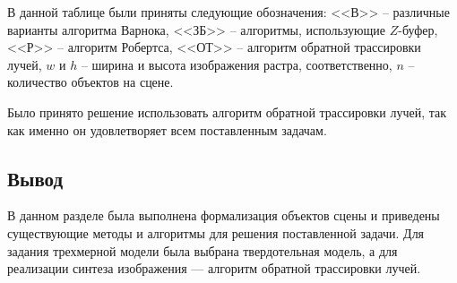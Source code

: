 В данной таблице были приняты следующие обозначения: <<В>> -- различные варианты алгоритма Варнока, <<ЗБ>> -- алгоритмы, использующие $Z$-буфер, <<Р>> -- алгоритм Робертса,  <<ОТ>> -- алгоритм обратной трассировки лучей, $w$ и $h$ -- ширина и высота изображения растра, соответственно, $n$ -- количество объектов на сцене.

Было принято решение использовать алгоритм обратной трассировки лучей, так как именно он удовлетворяет всем поставленным задачам.

\subsection*{Вывод}

В данном разделе была выполнена формализация объектов сцены и приведены существующие методы и алгоритмы для решения поставленной задачи. 
Для задания трехмерной модели была выбрана твердотельная модель, а для реализации синтеза изображения --- алгоритм обратной трассировки лучей.

\newpage